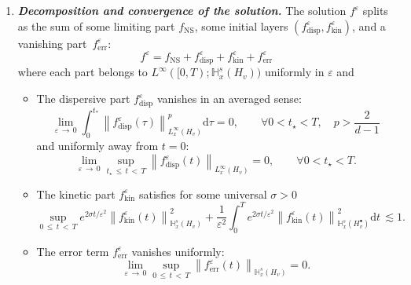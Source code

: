 \documentclass[AHL,Unicode,longabstracts,published]{cedram}
\newcommand{\err}{\mathrm{err}}
\newcommand{\ns}{\mathrm{NS}}
\newcommand{\kin}{\mathrm{kin}}
\renewcommand{\d}{\mathrm{d}}
\newcommand{\disp}{\mathrm{disp}}
\newcommand{\bbH}{\mathbb{H}}
\newcommand{\Ss}{H}
\newcommand{\Ssp}{H^{\bullet}}
\renewcommand*\le{\leqslant}
\renewcommand*\geq{\geqslant}
\newcommand*\eps{{\varepsilon}}
\let\oldforall\forall
\renewcommand*{\forall}{\mathrel{\oldforall}}
\begin{document}
\begin{theo}
\begin{enumerate}
\[
\sup_{0\,\le\,t\,<\,T} \left\| f^\eps(t) \right\|_{ \bbH^s_x \left(\Ss_v \right) } \le \frac{c_0}{\eps},
\]
which satisfies furthermore the following uniform estimate:
\[
\sup_{0\,\le\,t\,<\,T} \left\| f^\eps(t) \right\|_{ \bbH^s_x \left(\Ss_v \right) }^2 + \int_0^T \left\| | \nabla_x |^{ 1-\alpha} f^\eps(t) \right\|_{ \bbH^{s - (1-\alpha) }_x \left(\Ssp_v \right) }^2 \d t \, \lesssim 1,
\]
where we recall that $0 < \alpha < \frac{1}{2}$ if $d=2$ and $\alpha=0$ if $d\geq3.$
\item\label{theo1.12.2} \textit{\textbf{Decomposition and convergence of the solution.}} The solution $f^\eps$ splits as the sum of some limiting part $f_\ns$, some initial layers $(f^\eps_\disp, f^\eps_\kin)$, and a vanishing part~$f^\eps_\err$:
\begin{equation}\label{eq:decomp}
f^\eps = f_\ns + f^\eps_\disp + f^\eps_\kin + f^\eps_\err
\end{equation}
where {each part belongs to $L^\infty([0, T) ; \bbH_x^s (\Ss_v))$ uniformly in $\eps$ and}
\begin{itemize}
\item The dispersive part $f^\eps_\disp$ vanishes in an averaged sense:
\begin{equation*}
\lim_{\eps\,\to\,0}\int_0^{t_*} \left\|f^\eps_\disp(\tau)\right\|^p_{L^\infty_x(\Ss_v)}\d\tau=0, \qquad \forall 0 < t_\star < T, \quad p >\frac{2}{d-1}
\end{equation*}
and uniformly away from $t=0$:
\begin{equation*}
\lim_{\eps\,\to\,0}\sup_{t_\star\,\le\,t\,<\,T} \left\| f^\eps_\disp(t)\right\|_{ L^\infty_x \left(\Ss_v \right) }=0, \qquad \forall 0 < t_\star < T.
\end{equation*}
\item The kinetic part $f^\eps_\kin$ satisfies for some universal $\sigma > 0$
\begin{equation}\label{eq:fKIN}
\sup_{0\,\le\,t\,<\,T} e^{2 \sigma t / \eps^2} \left\| f^\eps_\kin(t) \right\|_{ \bbH^s_x \left(\Ss_v \right) }^2 + \frac{1}{\eps^2} \int_0^T e^{2 \sigma t / \eps^2} \left\| f^\eps_\kin(t) \right\|_{ \bbH^s_x \left(\Ssp_v \right) }^2 \d t \, {\lesssim 1}.
\end{equation}
\item The error term $f^\eps_\err$ vanishes uniformly:
\begin{equation*}
\lim_{\eps\,\to\,0} \sup_{0\,\le\,t\,<\,T} \left\| f^\eps_\err(t)\right\|_{ \bbH^s_x \left(\Ss_v \right) }=0.
\end{equation*}
\end{itemize}
\end{enumerate}
\end{theo}
\end{document}
